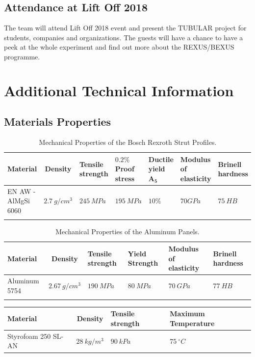 \documentclass[a4paper,12pt,oneside]{article}
\begin{document}
\begin{appendices}
\subsection{Attendance at Lift Off 2018}
The team will attend Lift Off 2018 event and present the TUBULAR project for students, companies and organizations. The guests will have a chance to have a peek at the whole experiment and find out more about the REXUS/BEXUS programme. 

\newpage
\section{Additional Technical Information}\label{sec:appM}
\subsection{Materials Properties}


\begin{longtable}{|m{}|c|m{}|m{}|m{}|m{}|m{}|}
\hline
\textbf{Material} & \textbf{Density} & \textbf{Tensile strength} & \textbf{$\mathbf{0.2 \% }$ Proof stress} & \textbf{Ductile yield $\mathbf{A_5}$} & \textbf{Modulus of elasticity}  & \textbf{Brinell hardness} \\ \hline 
EN AW - AlMgSi 6060 & $2.7\ g/cm^3$ & $245\ MPa$ & $195\ MPa$ & $10\%$ & $70 GPa$ & $75\ HB$ \\ \hline

\caption{Mechanical Properties of the Bosch Rexroth Strut Profiles.}
\label{table:profile_material}
\end{longtable}




\bigskip

\begin{longtable}{|m{} |c|m{}|m{}| m{} | m{}|}
\hline
\textbf{Material} & \textbf{Density} & \textbf{Tensile strength} & \textbf{Yield Strength} & \textbf{Modulus of elasticity}  & \textbf{Brinell hardness} \\ \hline 
Aluminum 5754 & $2.67\ g/cm^3$ & $190\ MPa$ & $80\ MPa$ & $70\ GPa$ & $77\ HB$ \\ \hline

\caption{Mechanical Properties of the Aluminum Panels.}
\label{table:wall_aluminum}
\end{longtable}
\bigskip
\begin{longtable}{|m{} |c|m{}|m{}|}
\hline
\textbf{Material} & \textbf{Density} & \textbf{Tensile strength} & \textbf{Maximum Temperature} \\ \hline 
Styrofoam 250 SL-AN & $28\ kg/m^3$ & $90\ kPa$ & $75\ ^\circ C$ \\ \hline


\end{longtable}
\end{appendices}
\end{document}
